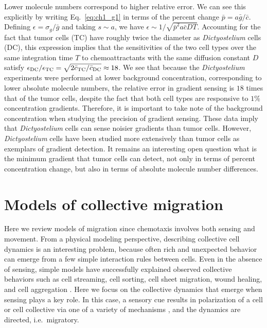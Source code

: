 Lower molecule numbers correspond to higher relative error. We can see this explicitly by writing Eq.\ \ref{eq:ch1_g1} in terms of the percent change $\bar{p} = a\bar{g}/\bar{c}$. Defining $\epsilon = \sigma_g/\bar{g}$ and taking $s \sim a$, we have
$\epsilon \sim 1/\sqrt{\bar{p}^2a\bar{c}DT}$.
Accounting for the fact that tumor cells (TC) have roughly twice the diameter as \textit{Dictyostelium} cells (DC), this expression implies that the sensitivities of the two cell types over the same integration time $T$ to chemoattractants with the same diffusion constant $D$ satisfy
$\epsilon_{\rm DC}/\epsilon_{\rm TC} = \sqrt{2\bar{c}_{\rm TC}/\bar{c}_{\rm DC}} \approx 18$.
We see that because the \textit{Dictyostelium} experiments were performed at lower background concentration, corresponding to lower absolute molecule numbers, the relative error in gradient sensing is $18$ times that of the tumor cells, despite the fact that both cell types are responsive to $1\%$ concentration gradients. Therefore, it is important to take note of the background concentration when studying the precision of gradient sensing. These data imply that \textit{Dictyostelium} cells can sense noisier gradients than tumor cells. However, \textit{Dictyostelium} cells have been studied more extensively than tumor cells as exemplars of gradient detection. It remains an interesting open question what is the minimum gradient that tumor cells can detect, not only in terms of percent concentration change, but also in terms of absolute molecule number differences.


\section{Models of collective migration}

Here we review models of migration since chemotaxis involves both sensing and movement. From a physical modeling perspective, describing collective cell dynamics is an interesting problem, because often rich and unexpected behavior can emerge from a few simple interaction rules between cells. Even in the absence of sensing, simple models have successfully explained observed collective behaviors such as cell streaming, cell sorting, cell sheet migration, wound healing, and cell aggregation \cite{kabla2012collective,szabo2010collective,basan2013alignment,janulevicius2015short}.
Here we focus on the collective dynamics that emerge when sensing plays a key role. In this case, a sensory cue results in polarization of a cell or cell collective via one of a variety of mechanisms \cite{jilkine2011comparison}, and the dynamics are directed, i.e.\ migratory.

